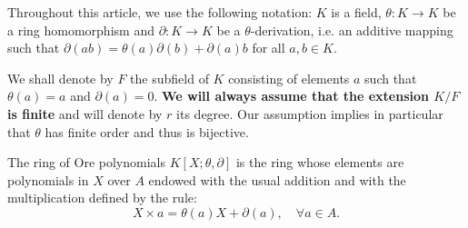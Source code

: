 \documentclass[a4paper]{llncs}
\begin{document}
Throughout this article, we use the following notation: $K$ is a field, 
$\theta : K \to K$ be a ring homomorphism and $\partial : K \to K$ be a 
$\theta$-derivation, i.e. an additive mapping such that $\partial(ab) = 
\theta(a)\partial(b) + \partial(a)b$ for all $a,b \in K$.

We shall denote by $F$ the subfield of $K$ consisting of elements
$a$ such that $\theta(a) = a$ and $\partial(a) = 0$. 
\textbf{We will always assume that the extension $K/F$ is finite}
and will denote by $r$ its degree. Our assumption implies in particular 
that $\theta$ has finite order and thus is bijective.


\begin{definition}
The ring of Ore polynomials $K[X; \theta, \partial]$ is the ring 
whose elements are polynomials in $X$ over $A$ endowed with the usual 
addition and with the multiplication defined by the rule:
$$X \times a = \theta(a)X + \partial(a), \quad \forall a \in A.$$
%
%
\end{definition}
\end{document}
